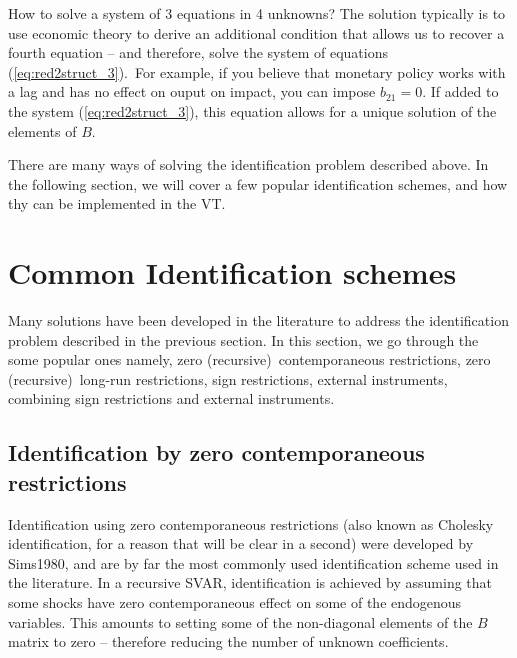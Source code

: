\documentclass[10pt]{article}
\begin{document}
How to solve a system of 3 equations in 4 unknowns? The solution typically
is to use economic theory to derive an additional condition that allows us
to recover a fourth equation -- and therefore, solve the system of equations
(\ref{eq:red2struct_3}).\ For example, if you believe that monetary policy
works with a lag and has no effect on ouput on impact, you can impose $%
b_{21}=0$. If added to the system (\ref{eq:red2struct_3}), this equation
allows for a unique solution of the elements of $B$.

There are many ways of solving the identification problem described above.
In the following section, we will cover a few popular identification
schemes, and how thy can be implemented in the VT.

\section{Common Identification schemes}

Many solutions have been developed in the literature to address the
identification problem described in the previous section. In this section,
we go through the some popular ones namely, zero (recursive)\
contemporaneous restrictions, zero (recursive)\ long-run restrictions, sign
restrictions, external instruments, combining sign restrictions and external
instruments.

\subsection{Identification by zero contemporaneous restrictions}

Identification using zero contemporaneous restrictions (also known as
Cholesky identification, for a reason that will be clear in a second) were
developed by Sims1980, and are by far the most commonly used identification
scheme used in the literature. In a recursive SVAR, identification is
achieved by assuming that some shocks have zero contemporaneous effect on
some of the endogenous variables. This amounts to setting some of the
non-diagonal elements of the $B$ matrix to zero -- therefore reducing the
number of unknown coefficients.
\end{document}
